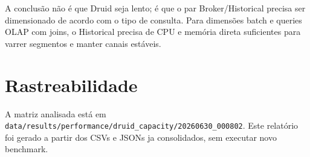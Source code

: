 \documentclass[11pt,a4paper]{article}
\begin{document}
A conclusão não é que Druid seja lento; é que o par Broker/Historical precisa ser dimensionado de acordo com o tipo de consulta. Para dimensões batch e queries OLAP com joins, o Historical precisa de CPU e memória direta suficientes para varrer segmentos e manter canais estáveis.

\section{Rastreabilidade}

A matriz analisada está em \texttt{data/results/performance/druid\_capacity/20260630\_000802}. Este relatório foi gerado a partir dos CSVs e JSONs ja consolidados, sem executar novo benchmark.
\end{document}
